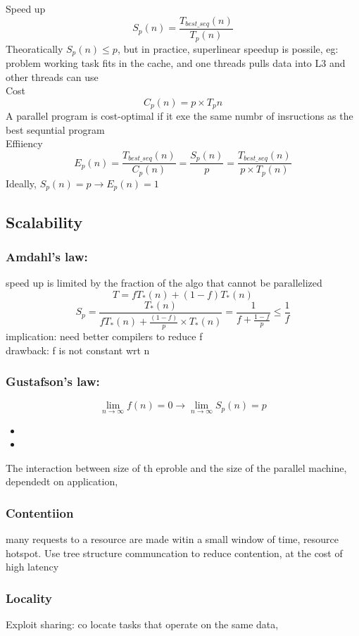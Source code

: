 \documentclass{article}
\begin{document}
Speed up
\[S_p(n) = \frac{T_{best\_seq}(n)}{T_p(n)}\]
Theoratically $S_p(n) \leq p$, but in practice, superlinear speedup is possile, eg: problem working task fits in the cache, and one threads pulls data into L3 and other threads can use\\
Cost
\[C_p(n) = p \times T_p{n}\]
A parallel program is cost-optimal if it exe the same numbr of insructions as the best sequntial program\\
Effiiency
\[E_p(n) = \frac{T_{best\_seq}(n)}{C_p(n)} = \frac{S_p(n)}{p} = \frac{T_{best\_seq}(n)}{p\times T_p(n)}\]
Ideally, $S_p(n) = p \rightarrow E_p(n) = 1$


\subsection{Scalability}
\subsubsection*{Amdahl's law: }
speed up is limited by the fraction of the algo that cannot be parallelized\\
\[T = fT_*(n) + (1-f)T_*(n)\]
\[S_p = \frac{T_*(n)}{fT_*(n) + \frac{(1-f)}{p}\times T_*(n)} = \frac{1}{f + \frac{1-f}{p}} \leq \frac{1}{f}\]
implication: need better compilers to reduce f\\
drawback: f is not constant wrt n\\
\subsubsection*{Gustafson's law:}
\[\lim_{n\rightarrow \infty} f(n) = 0 \rightarrow \lim_{n\rightarrow \infty} S_p(n) = p\]
\begin{itemize}
    \item 
    \item 
\end{itemize}

The interaction between size of th eproble  and the size of the parallel machine, dependedt on application, 







\subsubsection*{Contentiion}
many requests to a resource are made witin a small window of time, resource hotspot. Use tree structure communcation to reduce contention, at the cost of high latency 
\subsubsection*{Locality}
Exploit sharing: co locate tasks that operate on the same data, 
\end{document}
